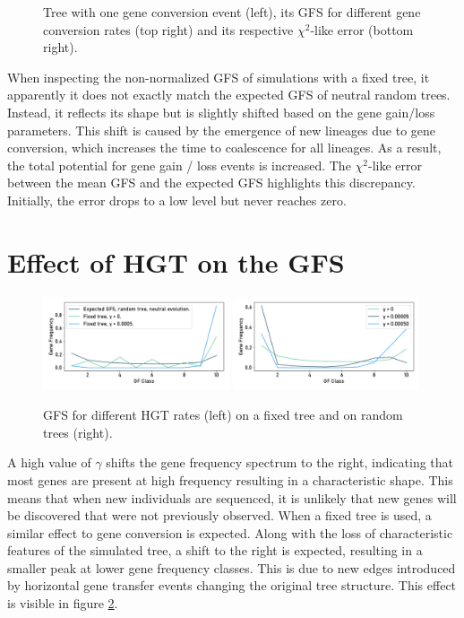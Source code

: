\begin{figure}[h]
\begin{minipage}{0.49\textwidth}
    \end{minipage}
    \caption[Effect of gene conversion on the GFS.]{Tree with one gene conversion event (left), its GFS for different gene conversion rates (top right) and
        its respective $\chi^2$-like error (bottom right).}
    \label{fig:tree-gc-loss}
\end{figure}

When inspecting the non-normalized \ac{GFS} of simulations with a fixed tree, it apparently it does not exactly match the expected \ac{GFS} of neutral random trees.
Instead, it reflects its shape but is slightly shifted based on the gene gain/loss parameters.
This shift is caused by the emergence of new lineages due to gene conversion, which increases the time to coalescence for all lineages.
As a result, the total potential for gene gain / loss events is increased.
The $\chi^2$-like error between the mean \ac{GFS} and the expected \ac{GFS} highlights this discrepancy.
Initially, the error drops to a low level but never reaches zero.

\section{Effect of HGT on the GFS}
\begin{figure}[h]
    \centering
    \includegraphics[width=0.49\textwidth]{figures/effect_on_gfs/gfs_hgt.pdf}
    \includegraphics[width=0.49\textwidth]{figures/effect_on_gfs/gfs_hgt_levels_2.pdf}
    \caption[Effect of HGT on the GFS.]{GFS for different HGT rates (left) on a fixed tree and on random trees (right).}
    \label{fig:hgt-loss}
\end{figure}

A high value of $\gamma$ shifts the gene frequency spectrum to the right, indicating that most genes are present at high frequency resulting in a characteristic  shape.
This means that when new individuals are sequenced, it is unlikely that new genes will be discovered that were not previously observed.
When a fixed tree is used, a similar effect to gene conversion is expected.
Along with the loss of characteristic features of the simulated tree, a shift to the right is expected, resulting in a smaller peak at lower gene frequency classes.
This is due to new edges introduced by horizontal gene transfer events changing the original tree structure.
This effect is visible in figure \ref{fig:hgt-loss}.

